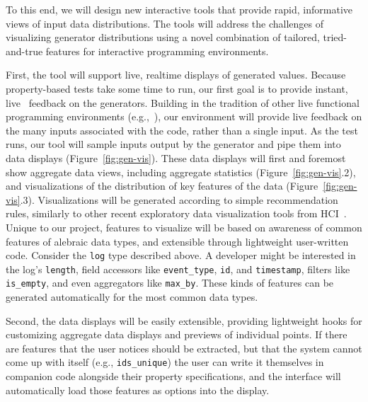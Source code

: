 To this end, we will design new interactive tools that provide rapid,
informative views of input data distributions. The tools will address the
challenges of visualizing generator distributions using a novel combination of
tailored, tried-and-true features for interactive programming environments.

First, the tool will support live, realtime displays of generated values.
Because property-based tests take some time to run, our first goal is to provide
instant, live~\cite{ref:tanimoto1990viva} feedback on the generators. Building
in the tradition of other live functional programming environments
(e.g.,~\cite{tool:lighttable,ref:omar2019live}), our environment will provide
live feedback on the many inputs associated with the code, rather than a single
input. As the test runs, our tool will sample inputs output by the generator and
pipe them into data displays (Figure~\ref{fig:gen-vis}). These data displays
will first and foremost show aggregate data views, including aggregate
statistics (Figure~\ref{fig:gen-vis}.2), and visualizations of the distribution
of key features of the data (Figure~\ref{fig:gen-vis}.3). Visualizations will be
generated according to simple recommendation rules, similarly to other recent
exploratory data visualization tools from
HCI~\cite{ref:lee2021lux,wongsuphasawat_voyager_2016,
wongsuphasawat_voyager_2017}. Unique to our project, features to visualize will
be based on awareness of common features of alebraic data types, and extensible
through lightweight user-written code. Consider the \lstinline{log} type
described above. A developer might be interested in the log's
\lstinline{length}, field accessors like \lstinline{event_type}, \lstinline{id},
and \lstinline{timestamp}, filters like \lstinline{is_empty}, and even
aggregators like \lstinline{max_by}. These kinds of features can be generated
automatically for the most common data types.

Second, the data displays will be easily extensible, providing lightweight hooks
for customizing aggregate data displays and previews of individual points.  If
there are features that the user notices should be extracted, but that the
system cannot come up with itself (e.g., \lstinline{ids_unique}) the user can
write it themselves in companion code alongside their property specifications,
and the interface will automatically load those features as options into the
display.

